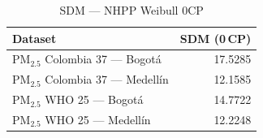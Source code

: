 \begin{table}[htbp]
\centering
\caption{SDM --- NHPP Weibull 0CP}
\label{tab:nhpp_sdm_0cp}
\begin{tabular}{lr}
\toprule
Dataset & SDM (0\,CP) \\
\midrule
PM$_{2.5}$ Colombia 37 --- Bogot\'{a} & 17.5285 \\
PM$_{2.5}$ Colombia 37 --- Medell\'{i}n & 12.1585 \\
PM$_{2.5}$ WHO 25 --- Bogot\'{a} & 14.7722 \\
PM$_{2.5}$ WHO 25 --- Medell\'{i}n & 12.2248 \\
\bottomrule
\end{tabular}
\end{table}
